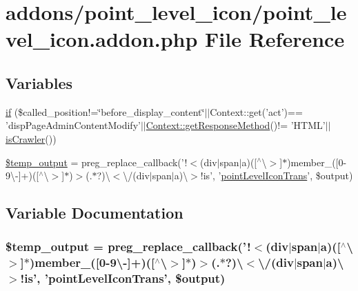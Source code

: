 \hypertarget{point__level__icon_8addon_8php}{\section{addons/point\+\_\+level\+\_\+icon/point\+\_\+level\+\_\+icon.addon.\+php File Reference}
\label{point__level__icon_8addon_8php}
}
\subsection*{Variables}
\begin{DoxyCompactItemize}
\item 
\hyperlink{point__level__icon_8addon_8php_a29031816e50a8f742422e671b2bef9b2}{if} (\$called\+\_\+position!=\char`\"{}before\+\_\+display\+\_\+content\char`\"{}$\vert$$\vert$Context\+::get('act')== 'disp\+Page\+Admin\+Content\+Modify'$\vert$$\vert$\hyperlink{classContext_a1d02a15209360034cd719d8b08cb5061}{Context\+::get\+Response\+Method}()!= 'H\+T\+M\+L'$\vert$$\vert$\hyperlink{func_8inc_8php_a490ffbd4821da1995c76c381553d5b3d}{is\+Crawler}())
\item 
\hyperlink{point__level__icon_8addon_8php_a5866ef6f77cbeaf87d8208cf805bbc3d}{\$temp\+\_\+output} = preg\+\_\+replace\+\_\+callback('!$<$(div$\vert$span$\vert$a)(\mbox{[}$^\wedge$\textbackslash{}$>$\mbox{]}$\ast$)member\+\_\+(\mbox{[}0-\/9\textbackslash{}-\/\mbox{]}+)(\mbox{[}$^\wedge$\textbackslash{}$>$\mbox{]}$\ast$)$>$(.$\ast$?)\textbackslash{}$<$\textbackslash{}/(div$\vert$span$\vert$a)\textbackslash{}$>$!is', '\hyperlink{point__level__icon_8lib_8php_a6581bcaf11de4c31924e7a5de3d6887d}{point\+Level\+Icon\+Trans}', \$output)
\end{DoxyCompactItemize}


\subsection{Variable Documentation}
\hypertarget{point__level__icon_8addon_8php_a5866ef6f77cbeaf87d8208cf805bbc3d}{
\subsubsection[{\$temp\+\_\+output}]{\setlength{\rightskip}{0pt plus 5cm}\$temp\+\_\+output = preg\+\_\+replace\+\_\+callback('!$<$(div$\vert$span$\vert$a)(\mbox{[}$^\wedge$\textbackslash{}$>$\mbox{]}$\ast$)member\+\_\+(\mbox{[}0-\/9\textbackslash{}-\/\mbox{]}+)(\mbox{[}$^\wedge$\textbackslash{}$>$\mbox{]}$\ast$)$>$(.$\ast$?)\textbackslash{}$<$\textbackslash{}/(div$\vert$span$\vert$a)\textbackslash{}$>$!is', '{\bf point\+Level\+Icon\+Trans}', \$output)}}\label{point__level__icon_8addon_8php_a5866ef6f77cbeaf87d8208cf805bbc3d}


